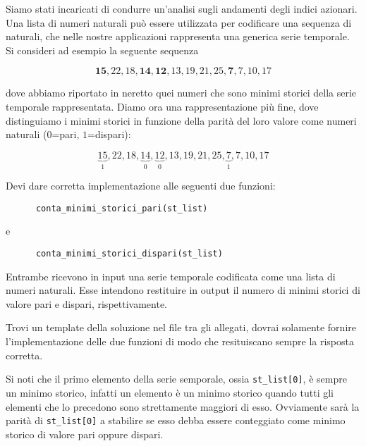 \renewcommand{\inputfile}{\texttt{stdin}}
\renewcommand{\outputfile}{\texttt{stdout}}
\makeatletter
\renewcommand{\this@inputfilename}{\texttt{stdin}}
\renewcommand{\this@outputfilename}{\texttt{stdout}}
\makeatother

Siamo stati incaricati di condurre un'analisi sugli andamenti degli indici azionari. 
Una lista di numeri naturali può essere utilizzata per codificare una sequenza di 
naturali, che nelle nostre applicazioni rappresenta una generica serie temporale. 
Si consideri ad esempio la seguente sequenza

\[
\mathbf{15}, 22, 18, \mathbf{14}, \mathbf{12}, 13, 19, 21, 25, \mathbf{7}, 7, 10, 17
\]
  
dove abbiamo riportato in neretto quei numeri che sono minimi storici della serie 
temporale rappresentata.
Diamo ora una rappresentazione più fine, 
dove distinguiamo i minimi storici in funzione della parità del loro valore come numeri naturali ($0$=pari, $1$=dispari):

\[
\underbrace{15}_{1}, 22, 18, \underbrace{14}_0, \underbrace{12}_0, 13, 19, 21, 25, \underbrace{7}_1, 7, 10, 17
\]
  
\noindent
Devi dare corretta implementazione alle seguenti due funzioni:\\

\begin{verbatim}
      conta_minimi_storici_pari(st_list)
\end{verbatim}

\noindent
e

\begin{verbatim}
      conta_minimi_storici_dispari(st_list)
\end{verbatim}

\noindent
Entrambe ricevono in input una serie temporale codificata come una lista di numeri naturali. 
Esse intendono restituire in output il numero di minimi storici di valore pari e dispari, rispettivamente.

    
Trovi un template della soluzione nel file \textbf{} 
tra gli allegati, dovrai solamente fornire l'implementazione delle due funzioni 
di modo che resituiscano sempre la risposta corretta.

Si noti che il primo elemento della serie semporale, ossia {\tt st\_list[0]}, 
è sempre un minimo storico, infatti un elemento è un minimo storico quando tutti 
gli elementi che lo precedono sono strettamente maggiori di esso. 
Ovviamente sarà la parità di {\tt st\_list[0]} a stabilire se esso debba essere 
conteggiato come minimo storico di valore pari oppure dispari. 


